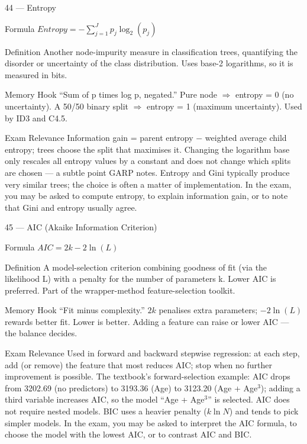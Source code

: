 \documentclass[aspectratio=169,8pt]{beamer}
\begin{document}
	\begin{frame}{44 --- Entropy}
		\begin{block}{Formula}
			$Entropy = -\sum_{j=1}^{J} p_j \log_2(p_j)$
		\end{block}
		\begin{block}{Definition}
			Another node-impurity measure in classification trees, quantifying the disorder or uncertainty of the class distribution. Uses base-2 logarithms, so it is measured in bits.
		\end{block}
		\begin{block}{Memory Hook}
			``Sum of p times log p, negated.'' Pure node $\Rightarrow$ entropy = 0 (no uncertainty). A 50/50 binary split $\Rightarrow$ entropy = 1 (maximum uncertainty). Used by ID3 and C4.5.
		\end{block}
		\begin{block}{Exam Relevance}
			Information gain = parent entropy $-$ weighted average child entropy; trees choose the split that maximises it. Changing the logarithm base only rescales all entropy values by a constant and does not change which splits are chosen --- a subtle point GARP notes. Entropy and Gini typically produce very similar trees; the choice is often a matter of implementation. In the exam, you may be asked to compute entropy, to explain information gain, or to note that Gini and entropy usually agree.
		\end{block}
	\end{frame}
	
	\begin{frame}{45 --- AIC (Akaike Information Criterion)}
		\begin{block}{Formula}
			$AIC = 2k - 2\ln(L)$
		\end{block}
		\begin{block}{Definition}
			A model-selection criterion combining goodness of fit (via the likelihood L) with a penalty for the number of parameters k. Lower AIC is preferred. Part of the wrapper-method feature-selection toolkit.
		\end{block}
		\begin{block}{Memory Hook}
			``Fit minus complexity.'' $2k$ penalises extra parameters; $-2\ln(L)$ rewards better fit. Lower is better. Adding a feature can raise or lower AIC --- the balance decides.
		\end{block}
		\begin{block}{Exam Relevance}
			Used in forward and backward stepwise regression: at each step, add (or remove) the feature that most reduces AIC; stop when no further improvement is possible. The textbook's forward-selection example: AIC drops from 3202.69 (no predictors) to 3193.36 (Age) to 3123.20 (Age + Age$^3$); adding a third variable increases AIC, so the model ``Age + Age$^3$'' is selected. AIC does not require nested models. BIC uses a heavier penalty ($k\ln N$) and tends to pick simpler models. In the exam, you may be asked to interpret the AIC formula, to choose the model with the lowest AIC, or to contrast AIC and BIC.
		\end{block}
	\end{frame}
	
\end{document}
